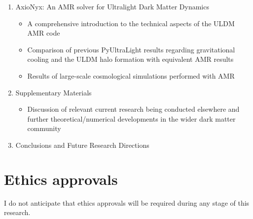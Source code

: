 \begin{enumerate}
\begin{itemize}
        \end{itemize}
    \item AxioNyx: An AMR solver for Ultralight Dark Matter Dynamics
        \begin{itemize}
            \item A comprehensive introduction to the technical aspects of the ULDM AMR code
            \item Comparison of previous PyUltraLight results regarding gravitational cooling and the ULDM halo formation with equivalent AMR results
            \item Results of large-scale cosmological simulations performed with AMR
        \end{itemize}
    \item Supplementary Materials
        \begin{itemize}
            \item Discussion of relevant current research being conducted elsewhere and further theoretical/numerical developments in the wider dark matter community
        \end{itemize}
    \item{Conclusions and Future Research Directions}
\end{enumerate}


\section{Ethics approvals}

I do not anticipate that ethics approvals will be required during any stage of this research. 
